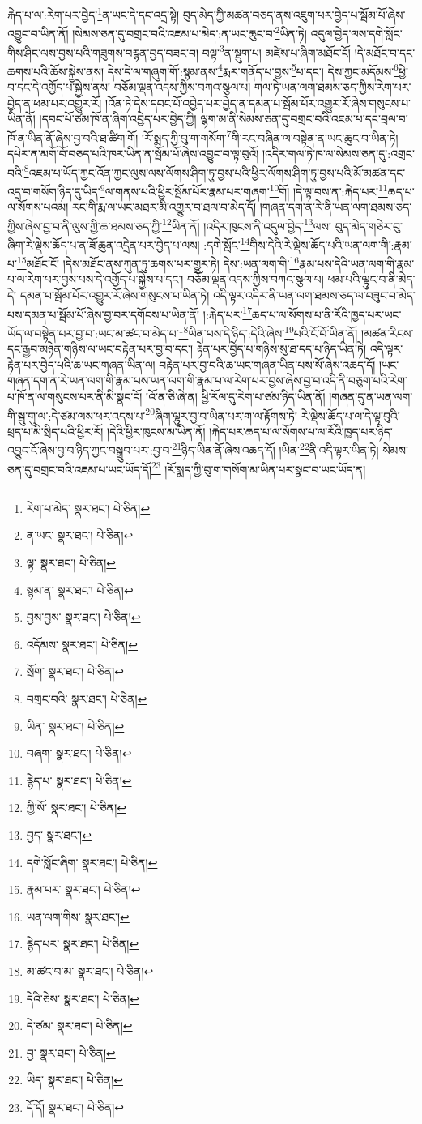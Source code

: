རྐེད་པ་ལ་:རེག་པར་བྱེད་\footnote{རེག་པ་མེད་  སྣར་ཐང་།  པེ་ཅིན། }ན་ཡང་དེ་དང་འདྲ་སྟེ། བུད་མེད་ཀྱི་མཚན་བཅད་ནས་འཇུག་པར་བྱེད་པ་སྦོམ་པོ་ཞེས་འབྱུང་བ་ཡིན་ནོ། །སེམས་ཅན་དུ་བགྲང་བའི་འཇམ་པ་མེད་:ན་ཡང་ཆུང་བ་\footnote{ན་ཡང་  སྣར་ཐང་།  པེ་ཅིན། }ཡིན་ཏེ། འདུལ་བྱེད་ལས་དགེ་སློང་གིས་ཤིང་ལས་བྱས་པའི་གཟུགས་བརྙན་བྱད་བཟང་བ། བལྟ་\footnote{ལྟ་  སྣར་ཐང་།  པེ་ཅིན། }ན་སྡུག་པ། མཛེས་པ་ཞིག་མཐོང་ངོ། །དེ་མཐོང་བ་དང་ཆགས་པའི་ཆོས་སྐྱེས་ནས། དེས་དེ་ལ་གཞུག་གོ་:སྙམ་ནས་\footnote{སྙམ་ན་  སྣར་ཐང་།  པེ་ཅིན། }རྨར་གནོད་པ་བྱས་\footnote{བྱས་བྱས་  སྣར་ཐང་།  པེ་ཅིན། }པ་དང་། དེས་ཀྱང་མདོམས་\footnote{འདོམས་  སྣར་ཐང་།  པེ་ཅིན། }ཕྱེ་བ་དང་དེ་འགྱོད་པ་སྐྱེས་ནས། བཅོམ་ལྡན་འདས་ཀྱིས་བཀའ་སྩལ་པ། གལ་ཏེ་ཡན་ལག་ཐམས་ཅད་ཀྱིས་རེག་པར་བྱེད་ན་ཕམ་པར་འགྱུར་རོ། །འོན་ཏེ་དེས་དབང་པོ་འབྱེད་པར་བྱེད་ན་དམན་པ་སྦོམ་པོར་འགྱུར་རོ་ཞེས་གསུངས་པ་ཡིན་ནོ། །དབང་པོ་ཙམ་ཁོ་ན་ཞིག་འབྱེད་པར་བྱེད་ཀྱི། ལྷག་མ་ནི་སེམས་ཅན་དུ་བགྲང་བའི་འཇམ་པ་དང་བྲལ་བ་ཁོ་ན་ཡིན་ནོ་ཞེས་བྱ་བའི་ཐ་ཚིག་གོ། །རོ་སྨད་ཀྱི་བུ་ག་གསོག་\footnote{སྲོག་  སྣར་ཐང་།  པེ་ཅིན། }གི་རང་བཞིན་ལ་བསྟེན་ན་ཡང་ཆུང་བ་ཡིན་ཏེ། དཔེར་ན་མགོ་བོ་བཅད་པའི་ཁར་ཡིན་ན་སྦོམ་པོ་ཞེས་འབྱུང་བ་ལྟ་བུའོ། །འདིར་གལ་ཏེ་ཁ་ལ་སེམས་ཅན་དུ་:འགྲང་བའི་\footnote{བགྲང་བའི་  སྣར་ཐང་།  པེ་ཅིན། }འཇམ་པ་ཡོད་ཀྱང་འོན་ཀྱང་ལུས་ལས་ལོགས་ཤིག་ཏུ་བྱས་པའི་ཕྱིར་ལོགས་ཤིག་ཏུ་བྱས་པའི་མོ་མཚན་དང་འདྲ་བ་གསོག་ཉིད་དུ་ཡིད་\footnote{ཡིན་  སྣར་ཐང་།  པེ་ཅིན། }ལ་གནས་པའི་ཕྱིར་སྦོམ་པོར་རྣམ་པར་གཞག་\footnote{བཞག་  སྣར་ཐང་།  པེ་ཅིན། }གོ། །དེ་ལྟ་བས་ན་:རྐེད་པར་\footnote{རྙེད་པ་  སྣར་ཐང་།  པེ་ཅིན། }ཆད་པ་ལ་སོགས་པའམ། རང་གི་རྨ་ལ་ཡང་མཐར་མི་འགྱུར་བ་ཐལ་བ་མེད་དོ། །གཞན་དག་ན་རེ་ནི་ཡན་ལག་ཐམས་ཅད་ཀྱིས་ཞེས་བྱ་བ་ནི་ལུས་ཀྱི་ཆ་ཐམས་ཅད་ཀྱི་\footnote{ཀྱི་སོ་  སྣར་ཐང་།  པེ་ཅིན། }ཡིན་ནོ། །འདིར་ཁུངས་ནི་འདུལ་བྱེད་\footnote{བྱད་  སྣར་ཐང་། }ལས། བུད་མེད་གཅེར་བུ་ཞིག་རེ་ལྡེས་ཆོད་པ་ན་ཟོ་ཆུན་འདྲེན་པར་བྱེད་པ་ལས། :དགེ་སློང་\footnote{དགེ་སློང་ཞིག་  སྣར་ཐང་།  པེ་ཅིན། }གིས་དེའི་རེ་ལྡེས་ཆོད་པའི་ཡན་ལག་གི་:རྣམ་པ་\footnote{རྣམ་པར་  སྣར་ཐང་།  པེ་ཅིན། }མཐོང་ངོ། །དེས་མཐོང་ནས་ཀུན་ཏུ་ཆགས་པར་གྱུར་ཏེ། དེས་:ཡན་ལག་གི་\footnote{ཡན་ལག་གིས་  སྣར་ཐང་། }རྣམ་པས་དེའི་ཡན་ལག་གི་རྣམ་པ་ལ་རེག་པར་བྱས་པས་དེ་འགྱོད་པ་སྐྱེས་པ་དང་། བཅོམ་ལྡན་འདས་ཀྱིས་བཀའ་སྩལ་པ། ཕམ་པའི་ལྟུང་བ་ནི་མེད་དེ། དམན་པ་སྦོམ་པོར་འགྱུར་རོ་ཞེས་གསུངས་པ་ཡིན་ཏེ། འདི་ལྟར་འདིར་ནི་ཡན་ལག་ཐམས་ཅད་ལ་བཟུང་བ་མེད་པས་དམན་པ་སྦོམ་པོ་ཞེས་བྱ་བར་དགོངས་པ་ཡིན་ནོ། །:རྐེད་པར་\footnote{རྙེད་པར་  སྣར་ཐང་།  པེ་ཅིན། }ཆད་པ་ལ་སོགས་པ་ནི་རོའི་ཁྱད་པར་ཡང་ཡོད་ལ་བསྟེན་པར་བྱ་བ་:ཡང་མ་ཚང་བ་མེད་པ་\footnote{མ་ཚང་བ་མ་  སྣར་ཐང་།  པེ་ཅིན། }ཡིན་པས་དེ་ཉིད་:དེའི་ཞེས་\footnote{དེའི་ཅེས་  སྣར་ཐང་།  པེ་ཅིན། }པའི་ངོ་བོ་ཡིན་ནོ། །མཚན་རིངས་དང་རྒྱབ་མཉེན་གཉིས་ལ་ཡང་བརྟེན་པར་བྱ་བ་དང་། རྟེན་པར་བྱེད་པ་གཉིས་སུ་ཐ་དད་པ་ཉིད་ཡིན་ཏེ། འདི་ལྟར་རྟེན་པར་བྱེད་པའི་ཆ་ཡང་གཞན་ཡིན་ལ། བརྟེན་པར་བྱ་བའི་ཆ་ཡང་གཞན་ཡིན་པས་སོ་ཞེས་འཆད་དོ། །ཡང་གཞན་དག་ན་རེ་ཡན་ལག་གི་རྣམ་པས་ཡན་ལག་གི་རྣམ་པ་ལ་རེག་པར་བྱས་ཞེས་བྱ་བ་འདི་ནི་བཅུག་པའི་རེག་པ་ཁོ་ན་ལ་གསུངས་པར་ནི་མི་སྣང་ངོ། །འོ་ན་ཅི་ཞེ་ན། ཕྱི་རོལ་དུ་རེག་པ་ཙམ་ཉིད་ཡིན་ནོ། །གཞན་དུ་ན་ཡན་ལག་གི་སྦུ་གུ་ལ་:དེ་ཙམ་ལས་ཕར་འདས་པ་\footnote{དེ་ཙམ་  སྣར་ཐང་།  པེ་ཅིན། }ཞིག་ལྷུར་བྱ་བ་ཡིན་པར་ག་ལ་རྟོགས་ཏེ། རེ་ལྡེས་ཆོད་པ་ལ་དེ་ལྟ་བུའི་ཕྲད་པ་མི་སྲིད་པའི་ཕྱིར་རོ། །དེའི་ཕྱིར་ཁུངས་མ་ཡིན་ནོ། །རྐེད་པར་ཆད་པ་ལ་སོགས་པ་ལ་རོའི་ཁྱད་པར་ཉིད་འབྱུང་ངོ་ཞེས་བྱ་བ་ཉིད་ཀྱང་བསྒྲུབ་པར་:བྱ་བ་\footnote{བྱ་  སྣར་ཐང་།  པེ་ཅིན། }ཉིད་ཡིན་ནོ་ཞེས་འཆད་དོ། །ཡིན་\footnote{ཡིད་  སྣར་ཐང་།  པེ་ཅིན། }ནི་འདི་ལྟར་ཡིན་ཏེ། སེམས་ཅན་དུ་བགྲང་བའི་འཇམ་པ་ཡང་ཡོད་དོ།\footnote{དོ་དོ།  སྣར་ཐང་།  པེ་ཅིན། } །རོ་སྨད་ཀྱི་བུ་ག་གསོག་མ་ཡིན་པར་སྣང་བ་ཡང་ཡོད་ན། 